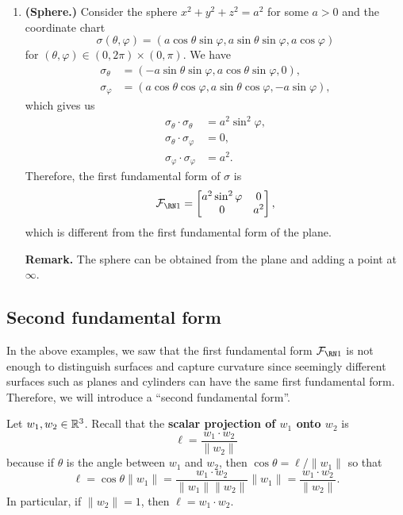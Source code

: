 \begin{enumerate}[(1)]
    \item {\bf (Sphere.)} Consider the sphere $x^2 + y^2 + z^2 = a^2$ 
    for some $a > 0$ and the coordinate chart
    \[ \sigma(\theta, \varphi) = (a\cos\theta\sin\varphi, a\sin\theta\sin\varphi, a\cos\varphi) \] 
    for $(\theta, \varphi) \in (0, 2\pi) \times (0, \pi)$. We have 
    \begin{align*}
        \sigma_\theta &= (-a\sin\theta\sin\varphi, a\cos\theta\sin\varphi, 0), \\ 
        \sigma_\varphi &= (a\cos\theta\cos\varphi, a\sin\theta\cos\varphi, -a\sin\varphi),
    \end{align*}
    which gives us 
    \begin{align*}
        \sigma_\theta \cdot \sigma_\theta &= a^2\sin^2\varphi, \\ 
        \sigma_\theta \cdot \sigma_\varphi &= 0, \\ 
        \sigma_\varphi \cdot \sigma_\varphi &= a^2.
    \end{align*}
    Therefore, the first fundamental form of $\sigma$ is 
    \[ \FFF = \begin{bmatrix}
        a^2\sin^2\varphi & 0 \\ 0 & a^2
    \end{bmatrix}, \] 
    which is different from the first fundamental form of the plane. 

    {\bf Remark.} The sphere can be obtained from the plane and adding a 
    point at $\infty$. 
\end{enumerate}

\subsection{Second fundamental form} \label{subsec:3.2}
In the above examples, we saw that the first fundamental form $\FFF$ 
is not enough to distinguish surfaces and capture curvature since 
seemingly different surfaces such as planes and cylinders can 
have the same first fundamental form. Therefore, we will introduce a 
``second fundamental form''.

Let $w_1, w_2 \in \mathbb{R}^3$. Recall that the {\bf scalar projection of 
$w_1$ onto $w_2$} is 
\[ \ell = \frac{w_1 \cdot w_2}{\|w_2\|} \] 
because if $\theta$ is the angle between $w_1$ and $w_2$, then 
$\cos\theta = \ell/\|w_1\|$ so that 
\[ \ell = \cos\theta \|w_1\| = \frac{w_1 \cdot w_2}{\|w_1\|\|w_2\|}\|w_1\| 
= \frac{w_1 \cdot w_2}{\|w_2\|}. \] 
In particular, if $\|w_2\| = 1$, then $\ell = w_1 \cdot w_2$. 

